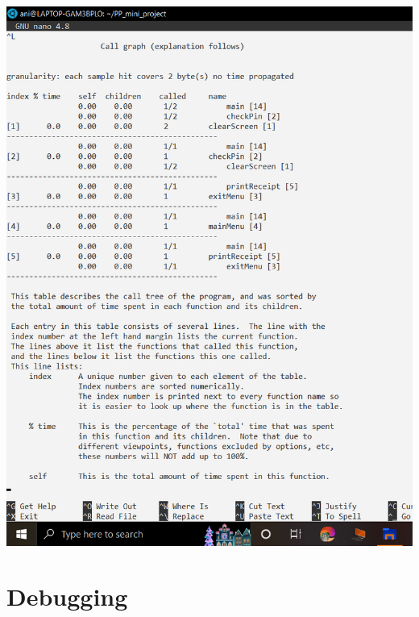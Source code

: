 \documentclass{article}
\begin{document}
\includegraphics[scale=0.35]{profilling3.png} \\

\section{Debugging}
\end{document}

